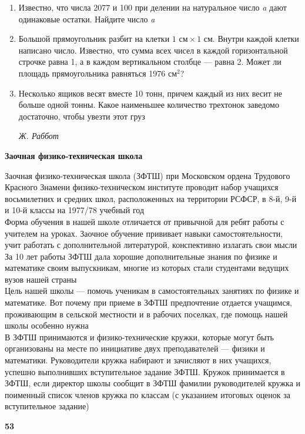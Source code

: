 \begin{multicols}{2}
\begin{enumerate}[itemsep=0pt, wide=0pt, itemindent=3em]
\item Известно, что числа 2077 и 100 при делении на натуральное число \textit{a} дают одинаковые остатки. Найдите число \textit{a}
\item Большой прямоугольник разбит на клетки $1\textit{ см}\times1\textit{ см}$. Внутри каждой клетки написано число. Известно, что сумма всех чисел в каждой горизонтальной строчке равна 1, а в каждом вертикальном столбце --- равна 2. Может ли площадь прямоугольника равняться 1976 $\textit{см}^2$?
\item Несколько ящиков весят вместе 10 тонн, причем каждый из них весит не больше одной тонны. Какое наименьшее количество трехтонок заведомо достаточно, чтобы увезти этот груз
\begin{flushright}
\vspace{-\baselineskip} %
\textit{Ж. Раббот}
\end{flushright}
\end{enumerate}
 
\end{multicols}
\begin{center}
    \textbf{\LARGE Заочная физико-техническая школа}    
\end{center}
Заочная физико-техническая школа (ЗФТШ) при Московском ордена Трудового Красного Знамени физико-техническом институте проводит набор учащихся восьмилетних и средних школ, расположенных на территории РСФСР, в 8-й, 9-й и 10-й классы на 1977/78 учебный год\\
\indent Форма обучения в нашей школе отличается от привычной для ребят работы с учителем на уроках. Заочное обучение прививает навыки самостоятельности, учит работать с дополнительной литературой, конспективно излагать свои мысли\\
\indent За 10 лет работы ЗФТШ дала хорошие дополнительные знания по физике и математике своим выпускникам, многие из которых стали студентами ведущих вузов нашей страны\\
\indent Цель нашей школы --- помочь ученикам в самостоятельных занятиях по физике и математике. Вот почему при приеме в ЗФТШ предпочтение отдается учащимся, проживающим в сельской местности и в рабочих поселках, где помощь нашей школы особенно нужна\\
\indent В ЗФТШ принимаются и физико-технические кружки, которые могут быть организованы на месте по инициативе двух преподавателей --- физики и математики. Руководители кружка набирают и зачисляют в них учащихся, успешно выполнивших вступительное задание ЗФТШ. Кружок принимается в ЗФТШ, если директор школы сообщит в ЗФТШ фамилии руководителей кружка и поименный список членов кружка по классам (с указанием итоговых оценок за вступительное задание)
\begin{flushright}
\vspace{-\baselineskip}
\textbf{53}
\end{flushright}
